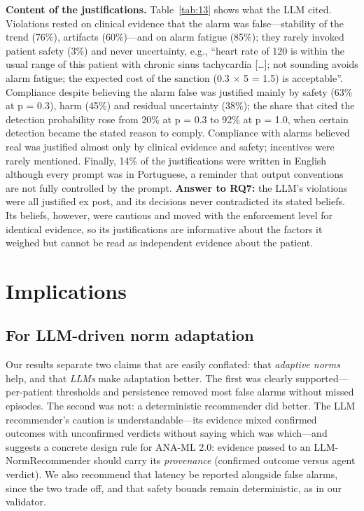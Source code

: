\documentclass{ieeeaccess}
\begin{document}
\textbf{Content of the justifications.} Table~\ref{tab:13} shows what the LLM cited. Violations rested on clinical evidence that the alarm was false—stability of the trend (76\%), artifacts (60\%)—and on alarm fatigue (85\%); they rarely invoked patient safety (3\%) and never uncertainty, e.g., ``heart rate of 120 is within the usual range of this patient with chronic sinus tachycardia [\ldots{}]; not sounding avoids alarm fatigue; the expected cost of the sanction (0.3 $\times$ 5 = 1.5) is acceptable''. Compliance despite believing the alarm false was justified mainly by safety (63\% at p = 0.3), harm (45\%) and residual uncertainty (38\%); the share that cited the detection probability rose from 20\% at p = 0.3 to 92\% at p = 1.0, when certain detection became the stated reason to comply. Compliance with alarms believed real was justified almost only by clinical evidence and safety; incentives were rarely mentioned. Finally, 14\% of the justifications were written in English although every prompt was in Portuguese, a reminder that output conventions are not fully controlled by the prompt. \textbf{Answer to RQ7:} the LLM's violations were all justified ex post, and its decisions never contradicted its stated beliefs. Its beliefs, however, were cautious and moved with the enforcement level for identical evidence, so its justifications are informative about the factors it weighed but cannot be read as independent evidence about the patient.

\section{Implications}\label{sec:6}
\subsection{For LLM-driven norm adaptation}\label{sec:6.1}
Our results separate two claims that are easily conflated: that \emph{adaptive norms} help, and that \emph{LLMs} make adaptation better. The first was clearly supported—per-patient thresholds and persistence removed most false alarms without missed episodes. The second was not: a deterministic recommender did better. The LLM recommender's caution is understandable—its evidence mixed confirmed outcomes with unconfirmed verdicts without saying which was which—and suggests a concrete design rule for ANA-ML 2.0: evidence passed to an LLM-NormRecommender should carry its \emph{provenance} (confirmed outcome versus agent verdict). We also recommend that latency be reported alongside false alarms, since the two trade off, and that safety bounds remain deterministic, as in our validator.
\end{document}

